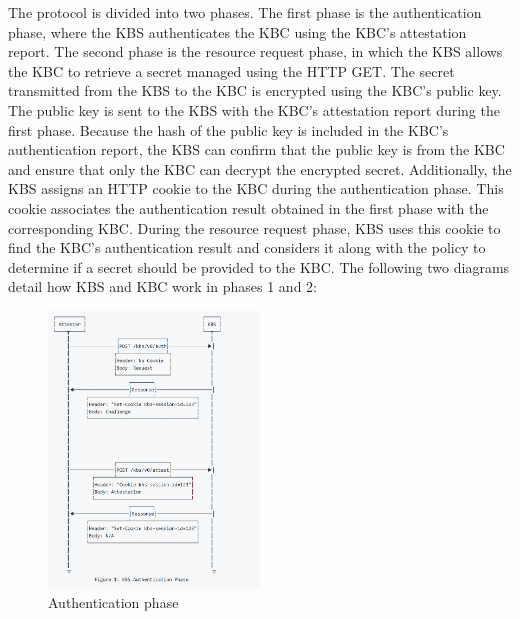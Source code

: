 The protocol is divided into two phases. The first phase is the authentication phase, where the KBS authenticates the KBC using the KBC's attestation report. The second phase is the resource request phase, in which the KBS allows the KBC to retrieve a secret managed using the HTTP GET.  
The secret transmitted from the KBS to the KBC is encrypted using the KBC's public key. The public key is sent to the KBS with the KBC's attestation report during the first phase. Because the hash of the public key is included in the KBC's authentication report, the KBS can confirm that the public 
key is from the KBC and ensure that only the KBC can decrypt the encrypted secret. Additionally, the KBS assigns an HTTP cookie to the KBC during the authentication phase. This cookie associates the authentication result obtained in the first phase with the corresponding KBC. During the resource 
request phase, KBS uses this cookie to find the KBC's authentication result and considers it along with the policy to determine if a secret should be provided to the KBC. The following two diagrams detail how KBS and KBC work in phases 1 and 2:


\begin{figure}[htp]
    \centering
    \includegraphics[width=0.5\textwidth]{images/attestation.PNG}
    \caption[Authentication phase]{Authentication phase}
    \label{fig:Authentication}
\end{figure}

